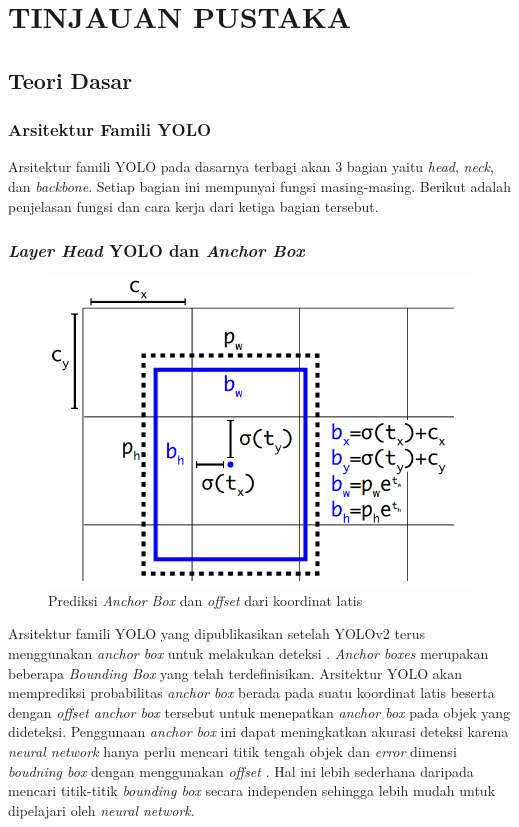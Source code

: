 \chapter{TINJAUAN PUSTAKA}
\section{Teori Dasar}
  \subsection{Arsitektur Famili YOLO}
    Arsitektur famili YOLO pada dasarnya terbagi akan 3 bagian yaitu \emph{head}, \emph{neck}, dan \emph{backbone}.
    Setiap bagian ini mempunyai fungsi masing-masing.
    Berikut adalah penjelasan fungsi dan cara kerja dari ketiga bagian tersebut.
    \subsection{\emph{Layer Head} YOLO dan \emph{Anchor Box}}
      \begin{figure}[ht]
          \centering
          \includegraphics[scale=0.4]{pictures/anchorbox.png}
          \caption{Prediksi \emph{Anchor Box} dan \emph{offset} dari koordinat latis \parencite{yolov3}}
          \label{fig:anchorbox}
      \end{figure}
      Arsitektur famili YOLO yang dipublikasikan setelah YOLOv2 terus menggunakan \emph{anchor box} untuk melakukan deteksi \parencites{yolov2}{yolov3}{yolov4}{scaledyolov4}{yolov5}{yolor}{yolov7}.
      \emph{Anchor boxes} merupakan beberapa \emph{Bounding Box} yang telah terdefinisikan. 
      Arsitektur YOLO akan memprediksi probabilitas \emph{anchor box} berada pada suatu koordinat latis beserta dengan \emph{offset anchor box} tersebut untuk menepatkan \emph{anchor box} pada objek yang dideteksi.
      Penggunaan \emph{anchor box} ini dapat meningkatkan akurasi deteksi karena \emph{neural network} hanya perlu mencari titik tengah objek dan \emph{error} dimensi \emph{boudning box} dengan menggunakan \emph{offset} \parencite{yolov3}.
      Hal ini lebih sederhana daripada mencari titik-titik \emph{bounding box} secara independen sehingga lebih mudah untuk dipelajari oleh \emph{neural network}.
  
